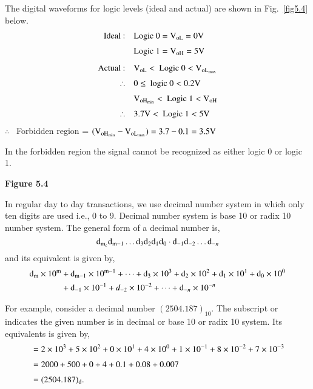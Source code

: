 The digital waveforms for logic levels (ideal and actual) are shown in Fig.~\ref{fig5.4} below.
\begin{align*}
\text{Ideal~:}\quad & \text{Logic } 0=\textrm{V}_{\textrm{o}\textrm{L}}=0\textrm{V}\\[3pt]
                    & \text{Logic } 1=\textrm{V}_{\textrm{o}\textrm{H}}=5\textrm{V}\\[5pt]
\text{Actual~:}\quad & \textrm{V}_{\textrm{o}\textrm{L}} <\text{ Logic } 0 <\textrm{V}_{\textrm{o}\textrm{L}_{\max}}\\[3pt]
\therefore\quad & 0\leq \text{ logic } 0<0.2\textrm{V}\\[3pt]
& \textrm{V}_{\textrm{o}\textrm{H}_{\text{min}}}<\text{ Logic } 1< \textrm{V}_{\textrm{o} \textrm{H}}\\[3pt]
\therefore\quad & 3.7\textrm{V} < \text{ Logic } 1< 5\textrm{V}
\end{align*}
$\therefore$~ Forbidden region = $(\textrm{V}_{\textrm{o}\textrm{H}_{\min}}-\textrm{V}_{\textrm{o}\textrm{L}_{\max}})=3.7-0.1=3.5\textrm{V}$

In the forbidden region the signal cannot be recognized as either logic 0 or logic 1.
\begin{center}
{\bf Figure 5.4}
\end{center}

\smallskip
{}

In regular day to day transactions, we use decimal number system in which only ten digits are used i.e., 0 to 9. Decimal number system is base 10 or radix 10 number system. The general form of a decimal number is,
$$
\textrm{d}_{\textrm{m}_{\textrm{c}}}\textrm{d}_{\textrm{m}-1}\ldots \textrm{d}_{3}\textrm{d}_{2}\textrm{d}_{1}\textrm{d}_{0}\cdot \textrm{d}_{-1}\textrm{d}_{-2}\ldots \textrm{d}_{-n}
$$
and its equivalent is given by,
\begin{align*}
\textrm{d}_{\textrm{m}}\times 10^{\textrm{m}} &+ \textrm{d}_{\textrm{m}-1}\times 10^{\textrm{m}-1}+\cdots+\textrm{d}_{3}\times 10^{3}+\textrm{d}_{2}\times 10^{2}+\textrm{d}_{1}\times 10^{1}+\textrm{d}_{0}\times 10^{0}\\
& + \textrm{d}_{-1}\times 10^{-1}+d_{-2}\times 10^{-2}+\cdots+\textrm{d}_{-n}\times 10^{-n}
\end{align*}

For example, consider a decimal number $(2504.187)_{10}$. The subscript or indicates the given number is in decimal or base 10 or radix 10 system. Its equivalents is given by,
\begin{align*}
&= 2\times 10^{3}+5\times 10^{2}+0\times 10^{1}+4\times 10^{0}+1\times 10^{-1}+8\times 10^{-2}+7\times 10^{-3}\\[3pt]
&= 2000+500+0+4+0.1+0.08+0.007\\[3pt]
&= (2504.187)_{\textrm{d}}.
\end{align*}

